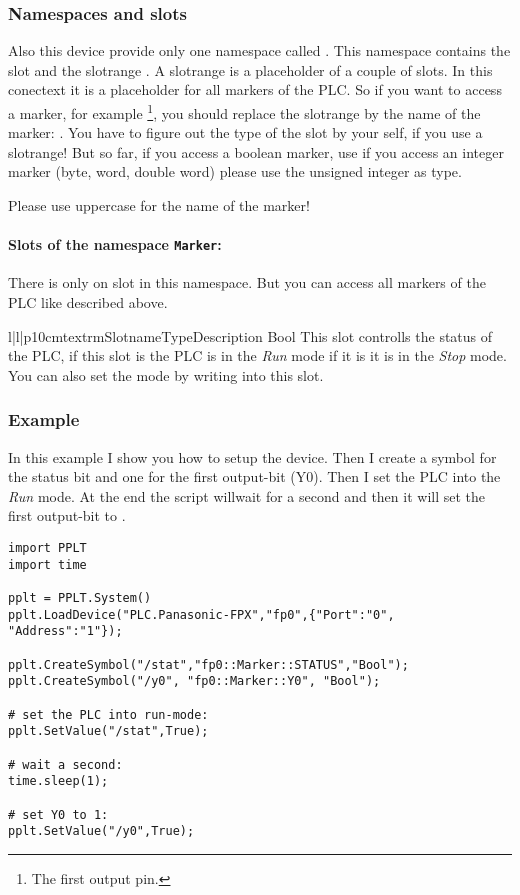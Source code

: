 \subsubsection{Namespaces and slots}
Also this device provide only one namespace called . This 
namespace contains the slot  and the slotrange . A
slotrange is a placeholder of a couple of slots. In this conectext it is a
placeholder for all markers of the PLC. So if you want to access a marker,
for example \footnote{The first output pin.}, you should replace
the slotrange by the name of the marker: . 
You have to figure out the type of the slot by your self, if you use
a slotrange! But so far, if you access a boolean marker, use 
if you access an integer marker (byte, word, double word) please use 
the unsigned integer  as type.
\begin{notice}
Please use uppercase for the name of the marker!
\end{notice}

\paragraph{Slots of the namespace \texttt{Marker}:}
There is only on slot in this namespace. But you can access all markers 
of the PLC like described above.
\begin{tableiii}{l|l|p{10cm}}{textrm}{Slotname}{Type}{Description}
        {Bool}
        {This slot controlls the status of the PLC, if this slot is 
         the PLC is in the \emph{Run} mode if it is
         it is in the \emph{Stop} mode. You can also
        set the mode by writing into this slot.}
\end{tableiii}

\subsubsection{Example}
In this example I show you how to setup the  
device. Then I create a symbol for the status bit and one for the first 
output-bit (Y0). Then I set the PLC into the \emph{Run} mode. At the end the
script willwait for a second and then it will set the first output-bit
to .

\begin{verbatim}
import PPLT
import time

pplt = PPLT.System()
pplt.LoadDevice("PLC.Panasonic-FPX","fp0",{"Port":"0", "Address":"1"});

pplt.CreateSymbol("/stat","fp0::Marker::STATUS","Bool");
pplt.CreateSymbol("/y0", "fp0::Marker::Y0", "Bool");

# set the PLC into run-mode:
pplt.SetValue("/stat",True);

# wait a second:
time.sleep(1);

# set Y0 to 1:
pplt.SetValue("/y0",True);
\end{verbatim}






